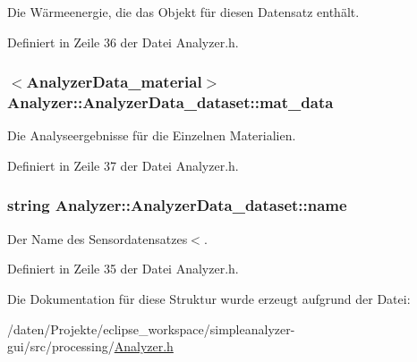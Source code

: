 Die Wärmeenergie, die das Objekt für diesen Datensatz enthält. 



Definiert in Zeile 36 der Datei Analyzer.\-h.

\hypertarget{structAnalyzer_1_1AnalyzerData__dataset_a25d0189c93bc0da58f778750edb2a2b9}{
\subsubsection[{mat\-\_\-data}]{$<${\bf Analyzer\-Data\-\_\-material}$>$ Analyzer\-::\-Analyzer\-Data\-\_\-dataset\-::mat\-\_\-data}}\label{structAnalyzer_1_1AnalyzerData__dataset_a25d0189c93bc0da58f778750edb2a2b9}


Die Analyseergebnisse für die Einzelnen Materialien. 



Definiert in Zeile 37 der Datei Analyzer.\-h.

\hypertarget{structAnalyzer_1_1AnalyzerData__dataset_a53f3c1896123de4dc00f01e593d5f70d}{
\subsubsection[{name}]{\setlength{\rightskip}{0pt plus 5cm}string Analyzer\-::\-Analyzer\-Data\-\_\-dataset\-::name}}\label{structAnalyzer_1_1AnalyzerData__dataset_a53f3c1896123de4dc00f01e593d5f70d}


Der Name des Sensordatensatzes$<$. 



Definiert in Zeile 35 der Datei Analyzer.\-h.



Die Dokumentation für diese Struktur wurde erzeugt aufgrund der Datei\-:\begin{DoxyCompactItemize}
\item 
/daten/\-Projekte/eclipse\-\_\-workspace/simpleanalyzer-\/gui/src/processing/\hyperlink{Analyzer_8h}{Analyzer.\-h}\end{DoxyCompactItemize}
